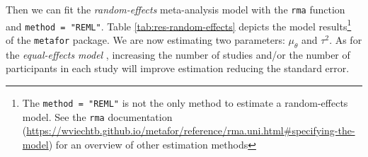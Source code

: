 \documentclass[
  man,floatsintext]{apa6}
\newenvironment{Shaded}{\begin{snugshade}}{\end{snugshade}}
\newcommand{\AttributeTok}[1]{\textcolor[rgb]{0.13,0.29,0.53}{#1}}
\newcommand{\CommentTok}[1]{\textcolor[rgb]{0.56,0.35,0.01}{\textit{#1}}}
\newcommand{\DecValTok}[1]{\textcolor[rgb]{0.00,0.00,0.81}{#1}}
\newcommand{\FloatTok}[1]{\textcolor[rgb]{0.00,0.00,0.81}{#1}}
\newcommand{\FunctionTok}[1]{\textcolor[rgb]{0.13,0.29,0.53}{\textbf{#1}}}
\newcommand{\NormalTok}[1]{#1}
\newcommand{\OtherTok}[1]{\textcolor[rgb]{0.56,0.35,0.01}{#1}}
\newcommand{\SpecialCharTok}[1]{\textcolor[rgb]{0.81,0.36,0.00}{\textbf{#1}}}
\newcommand{\StringTok}[1]{\textcolor[rgb]{0.31,0.60,0.02}{#1}}
\begin{document}
\begin{Shaded}
\end{Shaded}

\normalsize

Then we can fit the \emph{random-effects} meta-analysis model with the \texttt{rma} function and \texttt{method\ =\ "REML"}. Table \ref{tab:res-random-effects} depicts the model results\footnote{The \texttt{method\ =\ "REML"} is not the only method to estimate a random-effects model. See the \texttt{rma} documentation (\url{https://wviechtb.github.io/metafor/reference/rma.uni.html\#specifying-the-model}) for an overview of other estimation methods} of the \texttt{metafor} package. We are now estimating two parameters: \(\mu_{\theta}\) and \(\tau^{2}\). As for the \color{red} \emph{equal-effects model} \color{black}, increasing the number of studies and/or the number of participants in each study will improve estimation reducing the standard error.
\end{document}
